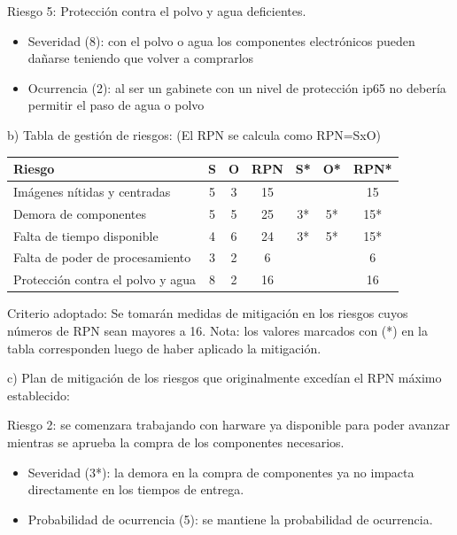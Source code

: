 \documentclass[11pt]{charter}
\begin{document}
Riesgo 5: Protección contra el polvo y agua deficientes.

\begin{itemize}
\item Severidad (8): con el polvo o agua los componentes electrónicos pueden dañarse teniendo que volver a comprarlos 
\item Ocurrencia (2): al ser un gabinete con un nivel de protección ip65 no debería permitir el paso de agua o polvo  
\end{itemize}


b) Tabla de gestión de riesgos:      (El RPN se calcula como RPN=SxO)

\begin{table}[htpb]
\centering
\begin{tabularx}{\linewidth}{@{}|X|c|c|c|c|c|c|@{}}
\hline
\rowcolor[HTML]{C0C0C0} 
Riesgo 								& S	& O	& RPN	& S* & O* & RPN* \\ \hline
Imágenes nítidas y centradas			& 5 & 3 & 15  	&    &    & 15   \\ \hline
Demora de componentes     			& 5 & 5 & 25  	& 3* & 5* & 15*  \\ \hline
Falta de tiempo disponible    		& 4 & 6 & 24  	& 3* & 5* & 15*  \\ \hline
Falta de poder de procesamiento		& 3 & 2 & 6   	&    &    & 6    \\ \hline
Protección contra el polvo y agua		& 8 & 2 & 16		&	 &    & 16   \\ \hline
\end{tabularx}%
\end{table}

Criterio adoptado: 
Se tomarán medidas de mitigación en los riesgos cuyos números de RPN sean mayores a 16.
\newline
Nota: los valores marcados con (*) en la tabla corresponden luego de haber aplicado la mitigación.

c) Plan de mitigación de los riesgos que originalmente excedían el RPN máximo establecido:


Riesgo 2: se comenzara trabajando con harware ya disponible para poder avanzar mientras se aprueba la compra de los componentes necesarios.

\begin{itemize}
\item Severidad (3*): la demora en la compra de componentes ya no impacta directamente en los tiempos de entrega.
\item Probabilidad de ocurrencia (5): se mantiene la probabilidad de ocurrencia.
 \end{itemize}
 
\end{document}
